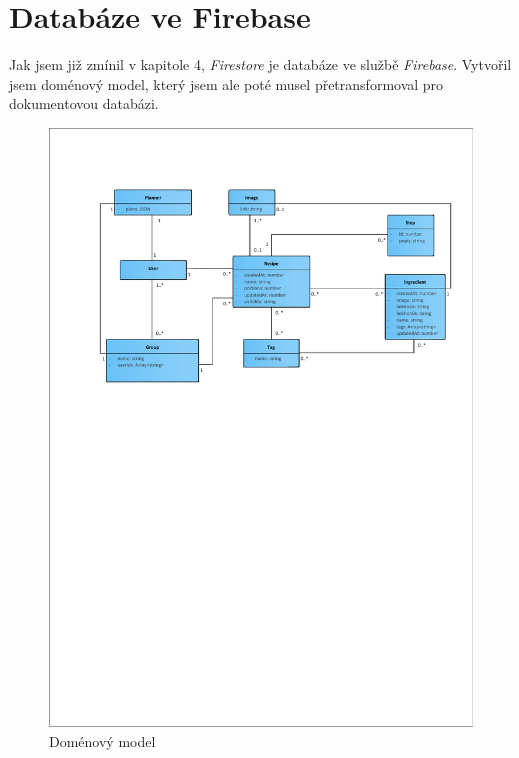 \section{Databáze ve Firebase}
Jak jsem již zmínil v kapitole 4, \emph{Firestore} je databáze ve službě \emph{Firebase}. Vytvořil jsem doménový model, který jsem ale poté musel přetransformoval pro
dokumentovou databázi.
\begin{figure}[h]
    \includegraphics[width=\textwidth]{pdf/domain-model}
    \caption{Doménový model} \label{picture:recipeo:domain-model}
\end{figure}
